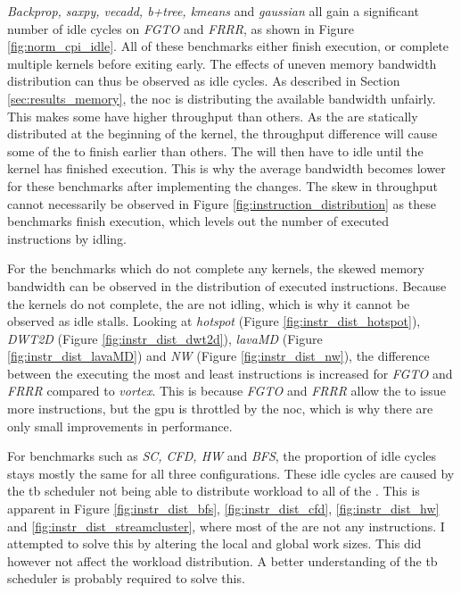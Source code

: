 \textit{Backprop, saxpy, vecadd, b+tree, kmeans} and \textit{gaussian} all gain a significant number of idle cycles on \textit{FGTO} and \textit{FRRR}, as shown in Figure \ref{fig:norm_cpi_idle}. All of these benchmarks either finish execution, or complete multiple kernels before exiting early. The effects of uneven memory bandwidth distribution can thus be observed as idle cycles. As described in Section \ref{sec:results_memory}, the \acrshort{noc} is distributing the available bandwidth unfairly. This makes some  have higher throughput than others. As the  are statically distributed at the beginning of the kernel, the throughput difference will cause some of the  to finish earlier than others. The  will then have to idle until the kernel has finished execution. This is why the average bandwidth becomes lower for these benchmarks after implementing the changes. The skew in throughput cannot necessarily be observed in Figure \ref{fig:instruction_distribution} as these benchmarks finish execution, which levels out the number of executed instructions by  idling.

For the benchmarks which do not complete any kernels, the skewed memory bandwidth can be observed in the distribution of executed instructions. Because the kernels do not complete, the  are not idling, which is why it cannot be observed as idle stalls. Looking at \textit{hotspot} (Figure \ref{fig:instr_dist_hotspot}), \textit{DWT2D} (Figure \ref{fig:instr_dist_dwt2d}), \textit{lavaMD} (Figure \ref{fig:instr_dist_lavaMD}) and \textit{NW} (Figure \ref{fig:instr_dist_nw}), the difference between the  executing the most and least instructions is increased for \textit{FGTO} and \textit{FRRR} compared to \textit{\Gls{vortex}}. This is because \textit{FGTO} and \textit{FRRR} allow the  to issue more instructions, but the \acrshort{gpu} is throttled by the \acrshort{noc}, which is why there are only small improvements in performance. 

For benchmarks such as \textit{SC, CFD, HW} and \textit{BFS}, the proportion of idle cycles stays mostly the same for all three configurations. These idle cycles are caused by the \acrshort{tb} scheduler not being able to distribute workload to all of the . This is apparent in Figure \ref{fig:instr_dist_bfs}, \ref{fig:instr_dist_cfd}, \ref{fig:instr_dist_hw} and \ref{fig:instr_dist_streamcluster}, where most of the  are not  any instructions. I attempted to solve this by altering the local and global work sizes. This did however not affect the workload distribution. A better understanding of the \acrshort{tb} scheduler is probably required to solve this. 

